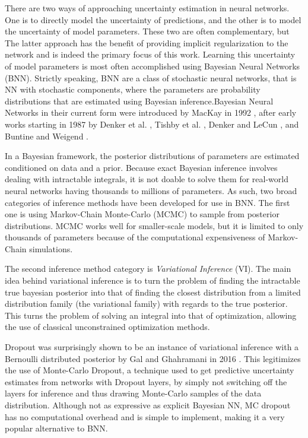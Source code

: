	There are two ways of approaching uncertainty estimation in neural networks. One is to directly model the uncertainty of predictions, and the other is to model the uncertainty of model parameters. These two are often complementary, but The latter approach has the benefit of providing implicit regularization to the network and is indeed the primary focus of this work. Learning this uncertainty of model parameters is most often accomplished using Bayesian Neural Networks (BNN). Strictly speaking, BNN are a class of stochastic neural networks, that is NN with stochastic components, where the parameters are probability distributions that are estimated using Bayesian inference.Bayesian Neural Networks in their current form were introduced by MacKay in 1992 \cite{mackay1992practical}, after early works starting in 1987 by Denker et al. \cite{denker1987large}, Tishby et al. \cite{tishby_consistent_1989}, Denker and LeCun \cite{denker_transforming_1990}, and Buntine and Weigend \cite{buntine1991bayesian}. 
	
	In a Bayesian framework, the posterior distributions of parameters are estimated conditioned on data and a prior. Because exact Bayesian inference involves dealing with intractable integrals, it is not doable to solve them for real-world neural networks having thousands to millions of parameters. As such, two broad categories of inference methods have been developed for use in BNN. The first one is using Markov-Chain Monte-Carlo (MCMC) to sample from posterior distributions. MCMC works well for smaller-scale models, but it is limited to only thousands of parameters because of the computational expensiveness of Markov-Chain simulations. 
	
	The second inference method category is \textit{Variational Inference} (VI). The main idea behind variational inference is to turn the problem of finding the intractable true bayesian posterior into that of finding the closest distribution from a limited distribution family (the variational family) with regards to the true posterior. This turns the problem of solving an integral into that of optimization, allowing the use of classical unconstrained optimization methods. 
	
	Dropout was surprisingly shown to be an instance of variational inference with a Bernoulli distributed posterior by Gal and Ghahramani in 2016 \cite{gal_dropout_2016}. This legitimizes the use of Monte-Carlo Dropout, a technique used to get predictive uncertainty estimates from networks with Dropout layers, by simply not switching off the layers for inference and thus drawing Monte-Carlo samples of the data distribution. Although not as expressive as explicit Bayesian NN, MC dropout has no computational overhead and is simple to implement, making it a very popular alternative to BNN. 
	
